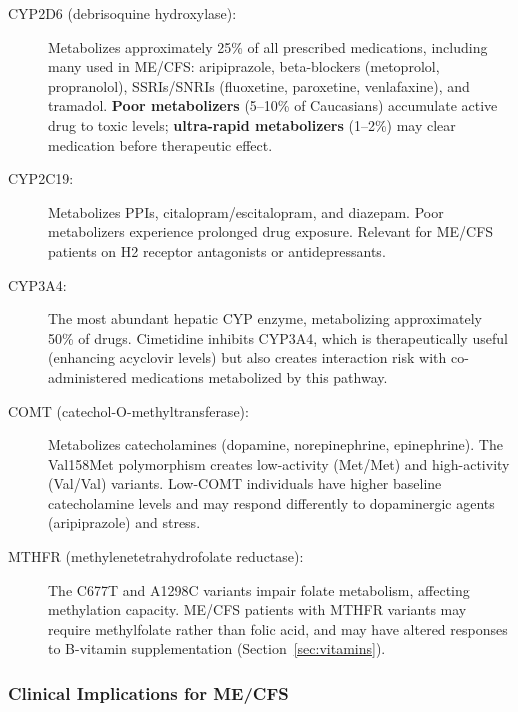 \begin{description}
    \item[CYP2D6 (debrisoquine hydroxylase):] Metabolizes approximately 25\% of all prescribed medications, including many used in ME/CFS: aripiprazole, beta-blockers (metoprolol, propranolol), SSRIs/SNRIs (fluoxetine, paroxetine, venlafaxine), and tramadol. \textbf{Poor metabolizers} (5--10\% of Caucasians) accumulate active drug to toxic levels; \textbf{ultra-rapid metabolizers} (1--2\%) may clear medication before therapeutic effect.

    \item[CYP2C19:] Metabolizes PPIs, citalopram/escitalopram, and diazepam. Poor metabolizers experience prolonged drug exposure. Relevant for ME/CFS patients on H2 receptor antagonists or antidepressants.

    \item[CYP3A4:] The most abundant hepatic CYP enzyme, metabolizing approximately 50\% of drugs. Cimetidine inhibits CYP3A4, which is therapeutically useful (enhancing acyclovir levels) but also creates interaction risk with co-administered medications metabolized by this pathway.

    \item[COMT (catechol-O-methyltransferase):] Metabolizes catecholamines (dopamine, norepinephrine, epinephrine). The Val158Met polymorphism creates low-activity (Met/Met) and high-activity (Val/Val) variants. Low-COMT individuals have higher baseline catecholamine levels and may respond differently to dopaminergic agents (aripiprazole) and stress.

    \item[MTHFR (methylenetetrahydrofolate reductase):] The C677T and A1298C variants impair folate metabolism, affecting methylation capacity. ME/CFS patients with MTHFR variants may require methylfolate rather than folic acid, and may have altered responses to B-vitamin supplementation (Section~\ref{sec:vitamins}).
\end{description}

\subsubsection{Clinical Implications for ME/CFS}

